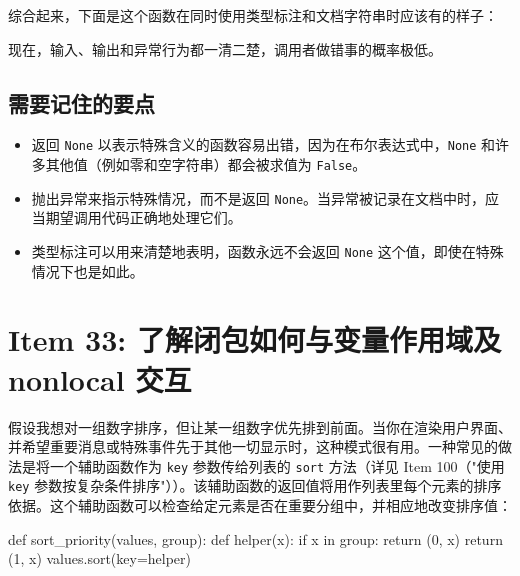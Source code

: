 综合起来，下面是这个函数在同时使用类型标注和文档字符串时应该有的样子：


现在，输入、输出和异常行为都一清二楚，调用者做错事的概率极低。

\subsection{需要记住的要点}

\begin{itemize}
\item 返回 \texttt{None} 以表示特殊含义的函数容易出错，因为在布尔表达式中，\texttt{None} 和许多其他值（例如零和空字符串）都会被求值为 \texttt{False}。
\item 抛出异常来指示特殊情况，而不是返回 \texttt{None}。当异常被记录在文档中时，应当期望调用代码正确地处理它们。
\item 类型标注可以用来清楚地表明，函数永远不会返回 \texttt{None} 这个值，即使在特殊情况下也是如此。
\end{itemize}

\section{Item 33: 了解闭包如何与变量作用域及 nonlocal 交互}

假设我想对一组数字排序，但让某一组数字优先排到前面。当你在渲染用户界面、并希望重要消息或特殊事件先于其他一切显示时，这种模式很有用。一种常见的做法是将一个辅助函数作为 \texttt{key} 参数传给列表的 \texttt{sort} 方法（详见 Item 100（"使用 \texttt{key} 参数按复杂条件排序"））。该辅助函数的返回值将用作列表里每个元素的排序依据。这个辅助函数可以检查给定元素是否在重要分组中，并相应地改变排序值：

\begin{codebox}[python]
def sort_priority(values, group):
    def helper(x):
        if x in group:
            return (0, x)
        return (1, x)
    values.sort(key=helper)
\end{codebox}

